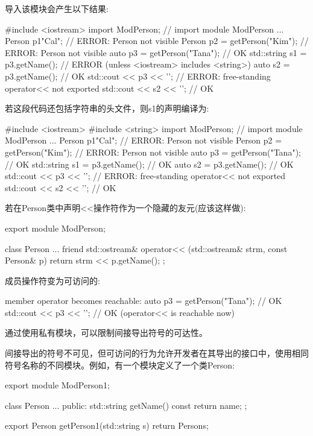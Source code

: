 导入该模块会产生以下结果:

\begin{cpp}
#include <iostream>
import ModPerson; // import module ModPerson
...
Person p1{"Cal"}; // ERROR: Person not visible
Person p2 = getPerson("Kim"); // ERROR: Person not visible
auto p3 = getPerson("Tana"); // OK
std::string s1 = p3.getName(); // ERROR (unless <iostream> includes <string>)
auto s2 = p3.getName(); // OK
std::cout << p3 << '\n'; // ERROR: free-standing operator<< not exported
std::cout << s2 << '\n'; // OK
\end{cpp}

若这段代码还包括字符串的头文件，则s1的声明编译为:

\begin{cpp}
#include <iostream>
#include <string>
import ModPerson; // import module ModPerson
...
Person p1{"Cal"}; // ERROR: Person not visible
Person p2 = getPerson("Kim"); // ERROR: Person not visible
auto p3 = getPerson("Tana"); // OK
std::string s1 = p3.getName(); // OK
auto s2 = p3.getName(); // OK
std::cout << p3 << '\n'; // ERROR: free-standing operator<< not exported
std::cout << s2 << '\n'; // OK
\end{cpp}

若在Person类中声明<{}<操作符作为一个隐藏的友元(应该这样做):

\begin{cpp}
export module ModPerson;

class Person {
	...
	friend std::ostream& operator<< (std::ostream& strm, const Person& p) {
		return strm << p.getName();
	}
};
\end{cpp}

成员操作符变为可访问的:

\begin{cpp}
member operator becomes reachable:
auto p3 = getPerson("Tana"); // OK
std::cout << p3 << '\n'; // OK (operator<< is reachable now)
\end{cpp}

通过使用私有模块，可以限制间接导出符号的可达性。


间接导出的符号不可见，但可访问的行为允许开发者在其导出的接口中，使用相同符号名称的不同模块。例如，有一个模块定义了一个类Person:

\begin{cpp}
export module ModPerson1;

class Person {
	...
	public:
	std::string getName() const {
		return name;
	}
};

export Person getPerson1(std::string s) {
	return Person{s};
}
\end{cpp}

